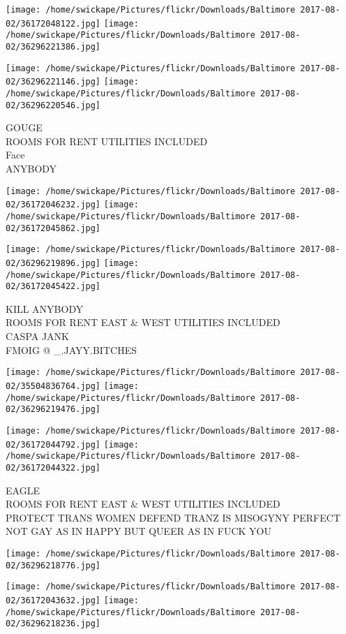 \documentclass[10pt,letterpaper]{article}
\begin{document}
\texttt{[image: /home/swickape/Pictures/flickr/Downloads/Baltimore 2017-08-02/36172048122.jpg]}
\texttt{[image: /home/swickape/Pictures/flickr/Downloads/Baltimore 2017-08-02/36296221386.jpg]}

\texttt{[image: /home/swickape/Pictures/flickr/Downloads/Baltimore 2017-08-02/36296221146.jpg]}
\texttt{[image: /home/swickape/Pictures/flickr/Downloads/Baltimore 2017-08-02/36296220546.jpg]}

GOUGE\\
ROOMS FOR RENT UTILITIES INCLUDED\\
Face\\
ANYBODY
\pagebreak

\texttt{[image: /home/swickape/Pictures/flickr/Downloads/Baltimore 2017-08-02/36172046232.jpg]}
\texttt{[image: /home/swickape/Pictures/flickr/Downloads/Baltimore 2017-08-02/36172045862.jpg]}

\texttt{[image: /home/swickape/Pictures/flickr/Downloads/Baltimore 2017-08-02/36296219896.jpg]}
\texttt{[image: /home/swickape/Pictures/flickr/Downloads/Baltimore 2017-08-02/36172045422.jpg]}

KILL ANYBODY\\
ROOMS FOR RENT EAST \& WEST UTILITIES INCLUDED\\
CASPA JANK\\
FMOIG @ \_.JAYY.BITCHES
\pagebreak

\texttt{[image: /home/swickape/Pictures/flickr/Downloads/Baltimore 2017-08-02/35504836764.jpg]}
\texttt{[image: /home/swickape/Pictures/flickr/Downloads/Baltimore 2017-08-02/36296219476.jpg]}

\texttt{[image: /home/swickape/Pictures/flickr/Downloads/Baltimore 2017-08-02/36172044792.jpg]}
\texttt{[image: /home/swickape/Pictures/flickr/Downloads/Baltimore 2017-08-02/36172044322.jpg]}

EAGLE\\
ROOMS FOR RENT EAST \& WEST UTILITIES INCLUDED\\
PROTECT TRANS WOMEN DEFEND TRANZ IS MISOGYNY PERFECT\\
NOT GAY AS IN HAPPY BUT QUEER AS IN FUCK YOU
\pagebreak

\texttt{[image: /home/swickape/Pictures/flickr/Downloads/Baltimore 2017-08-02/36296218776.jpg]}

\vspace{0.25in}
\texttt{[image: /home/swickape/Pictures/flickr/Downloads/Baltimore 2017-08-02/36172043632.jpg]}
\texttt{[image: /home/swickape/Pictures/flickr/Downloads/Baltimore 2017-08-02/36296218236.jpg]}
\end{document}
